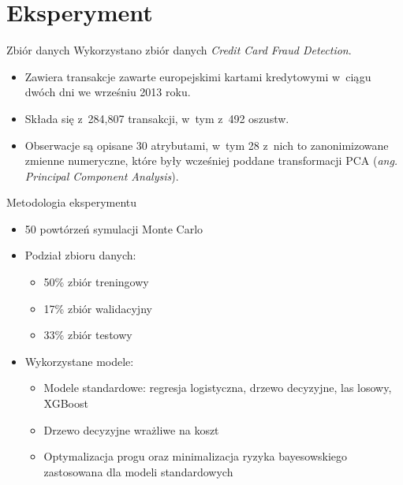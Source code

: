 \documentclass{beamer}
\begin{document}
\section{Eksperyment}

\begin{frame}{Zbiór danych}
	Wykorzystano zbiór danych \emph{Credit Card Fraud Detection}.
	\begin{itemize}
		\item Zawiera transakcje zawarte europejskimi kartami kredytowymi w~ciągu dwóch dni we wrześniu 2013 roku.
		\item Składa się z~284,807 transakcji, w~tym z~492 oszustw.
		\item Obserwacje są opisane 30 atrybutami, w~tym 28 z~nich to zanonimizowane zmienne numeryczne, które były wcześniej poddane transformacji PCA (\textit{ang. Principal Component Analysis}).
	\end{itemize}
\end{frame}

\begin{frame}{Metodologia eksperymentu}
	\begin{itemize}
		\item 50 powtórzeń symulacji Monte Carlo 
		\item Podział zbioru danych:
		\begin{itemize}
			\item 50\% zbiór treningowy
			\item 17\% zbiór walidacyjny
			\item 33\% zbiór testowy
		\end{itemize}
		\item Wykorzystane modele:
		\begin{itemize}
			\item Modele standardowe: regresja logistyczna, drzewo decyzyjne, las losowy, XGBoost
			\item Drzewo decyzyjne wrażliwe na koszt
			\item Optymalizacja progu oraz minimalizacja ryzyka bayesowskiego zastosowana dla modeli standardowych
		\end{itemize}
	\end{itemize}
\end{frame}
\end{document}
